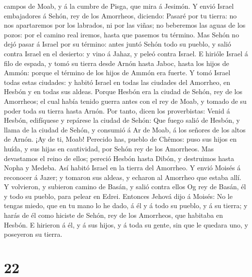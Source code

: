 campos de Moab, y á la cumbre de Pisga, que mira á Jesimón.
 Y envió Israel embajadores á Sehón, rey de los
Amorrheos, diciendo:  Pasaré por tu tierra: no nos
apartaremos por los labrados, ni por las viñas; no beberemos las aguas
de los pozos: por el camino real iremos, hasta que pasemos tu término.
 Mas Sehón no dejó pasar á Israel por su término: antes
juntó Sehón todo su pueblo, y salió contra Israel en el desierto: y vino
á Jahaz, y peleó contra Israel.  E hirióle Israel á filo
de espada, y tomó su tierra desde Arnón hasta Jaboc, hasta los hijos de
Ammón: porque el término de los hijos de Ammón era fuerte.
 Y tomó Israel todas estas ciudades: y habitó Israel en
todas las ciudades del Amorrheo, en Hesbón y en todas sus aldeas.
 Porque Hesbón era la ciudad de Sehón, rey de los
Amorrheos; el cual había tenido guerra antes con el rey de Moab, y
tomado de su poder toda su tierra hasta Arnón.  Por
tanto, dicen los proverbistas: Venid á Hesbón, edifíquese y repárese la
ciudad de Sehón:  Que fuego salió de Hesbón, y llama de
la ciudad de Sehón, y consumió á Ar de Moab, á los señores de los altos
de Arnón.  ¡Ay de ti, Moab! Perecido has, pueblo de
Chêmos: puso sus hijos en huída, y sus hijas en cautividad, por Sehón
rey de los Amorrheos.  Mas devastamos el reino de ellos;
pereció Hesbón hasta Dibón, y destruimos hasta Nopha y Medeba.
 Así habitó Israel en la tierra del Amorrheo.
 Y envió Moisés á reconocer á Jazer; y tomaron sus
aldeas, y echaron al Amorrheo que estaba allí.  Y
volvieron, y subieron camino de Basán, y salió contra ellos Og rey de
Basán, él y todo su pueblo, para pelear en Edrei. 
Entonces Jehová dijo á Moisés: No le tengas miedo, que en tu mano lo he
dado, á él y á todo su pueblo, y á su tierra; y harás de él como hiciste
de Sehón, rey de los Amorrheos, que habitaba en Hesbón. 
E hirieron á él, y á sus hijos, y á toda su gente, sin que le quedara
uno, y poseyeron su tierra.

\hypertarget{section-21}{%
\section{22}\label{section-21}}

